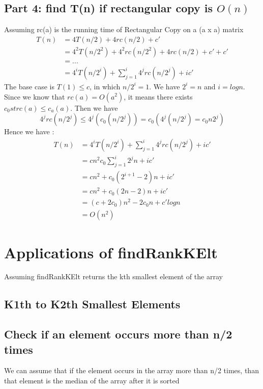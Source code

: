 \documentclass{article}
\begin{document}
    \subsection{Part 4: find T(n) if rectangular copy is $O(n)$}
    Assuming rc(a) is the running time of Rectangular Copy on a (a x a) matrix
        \begin{align*}
            T(n) &= 4T(n/2) + 4rc(n/2) + c'\\
            &= 4^2T(n/2^2) + 4^2rc(n/2^2) + 4rc(n/2) + c' + c'\\
            &= ... \\
            &= 4^iT(n/2^i) + \sum_{j=1}^{i}4^jrc(n/2^j) + ic'
        \end{align*}
        The base case is $T(1) \leq c$, in which $n/2^i = 1$. We have $2^i = n$ and $i = log n$. Since we know that $rc(a) = O(a^2)$, it means there exists $c_0 st rc(a) \leq c_a(a)$. Then we have
        \[4^jrc(n/2^j) \leq 4^j(c_0(n/2^j)) = c_0(4^j(n/2^j) = c_0n2^j)\]
        Hence we have :
        \begin{align*}
            T(n) &= 4^iT(n/2^i) + \sum_{j=1}^{i}4^jrc(n/2^j) + ic'\\
            &= cn^2 c_0 \sum_{j=1}^{i} 2^jn + ic'\\
            &= cn^2 + c_0(2^{i+1} - 2)n + ic'\\
            &= cn^2 + c_0(2n - 2)n + ic'\\
            &= (c+2c_0)n^2 - 2c_0n + c'log n\\
            &= O(n^2)
        \end{align*}
\section{Applications of findRankKElt}
\label{sec:Applications of findRankKElt}
    Assuming findRankKElt returns the kth smallest element of the array

    \subsection{K1th to K2th Smallest Elements}
    \label{sub:K1th to K2th Smallest Elements}
        

    \subsection{Check if an element occurs more than n/2 times}
    \label{sub:Check if an element occurs more than n/2 times}
        We can assume that if the element occurs in the array more than n/2 times, than that element is the median of the array after it is sorted
\end{document}
